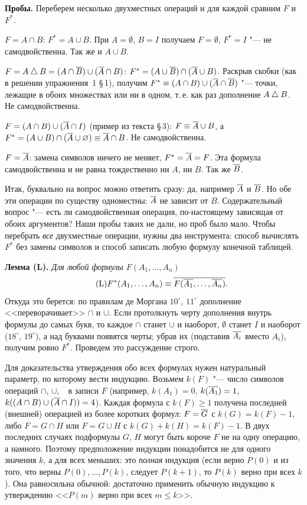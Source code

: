 \begin{solution}[1 (\S\,3)]
\textbf{Пробы.} Переберем несколько двухместных операций и для каждой
сравним $F$ и $F^*$.

$F=A\cap B$: $F^*=A\cup B$. При $A=\emptyset$, $B=I$ получаем $F=\emptyset$,
$F^*=I$ "--- не самодвойственна. Так же и $A\cup B$.

$F=A\mathbin{\triangle} B=(A\cap\overline{B})\cup(\overline{A}\cap B)$: $F^*=(A\cup\overline{B})\cap(\overline{A}\cup B)$.
Раскрыв скобки (как в решении упражнения~1 \S\,1), получим
$F^*\equiv(A\cap B)\cup(\overline{A}\cap\overline{B})$ "--- точки, лежащие в обоих
множествах или ни в одном, т.\,е. как раз дополнение $A\mathbin{\triangle} B$. Не
самодвойственна.

$F=(A\cap B)\cup(\overline{A}\cap I)$ (пример из текста \S\,3): $F\equiv\overline{A}\cup B$,
а $F^*=(A\cup B)\cap(\overline{A}\cup\varnothing)\equiv\overline{A}\cap B$. Не
самодвойственна.

$F=\overline{A}$: замена символов ничего не меняет, $F^*=\overline{A}=F$. Эта формула
самодвойственна и не равна тождественно ни $A$, ни $B$. Так же $\overline{B}$.

Итак, буквально на вопрос можно ответить сразу: да, например $\overline{A}$
и $\overline{B}$. Но обе эти операции по существу одноместны: $\overline{A}$ не зависит
от $B$. Содержательный вопрос "--- есть ли самодвойственная операция,
по-настоящему зависящая от обоих аргументов? Наши пробы таких не дали,
но проб было мало. Чтобы перебрать \emph{все} двухместные операции, нужны
два инструмента: способ вычислять $F^*$ без замены символов и способ
записать любую формулу конечной таблицей.

\textbf{Лемма (L).} \emph{Для любой формулы $F(A_1,\dots,A_n)$}
\begin{equation*}\tag{L}
F^*(A_1,\dots,A_n)\equiv\overline{F(\overline{A_1},\dots,\overline{A_n})}.
\end{equation*}
Откуда это берется: по правилам де Моргана $10^\circ$, $11^\circ$
дополнение <<переворачивает>> $\cap$ и $\cup$. Если протолкнуть черту
дополнения внутрь формулы до самых букв, то каждое $\cap$ станет $\cup$
и наоборот, $\emptyset$ станет $I$ и наоборот ($18^\circ$, $19^\circ$),
а над буквами появятся черты; убрав их (подставив $\overline{A_i}$ вместо $A_i$),
получим ровно $F^*$. Проведем это рассуждение строго.

Для доказательства утверждения обо всех формулах нужен натуральный
параметр, по которому вести индукцию. Возьмем $k(F)$ "--- число символов
операций $\cap$, $\cup$, ${}^{\overline{\phantom a}}$ в записи $F$
(например, $k(A_1)=0$, $k(\overline{A_1})=1$, $k((A\cap B)\cup(\overline{A}\cap I))=4$).
Каждая формула с $k(F)\ge1$ получена последней (внешней) операцией из
более коротких формул: $F=\overline{G}$ с $k(G)=k(F)-1$, либо $F=G\cap H$ или
$F=G\cup H$ с $k(G)+k(H)=k(F)-1$. В двух последних случаях подформулы
$G$, $H$ могут быть короче $F$ не на одну операцию, а намного. Поэтому
предположение индукции понадобится не для одного значения $k$, а для всех
меньших: это \emph{полная} индукция (если верно $P(0)$ и из того, что
верны $P(0),\dots,P(k)$, следует $P(k+1)$, то $P(k)$ верно при всех $k$).
Она равносильна обычной: достаточно применить обычную индукцию
к утверждению <<$P(m)$ верно при всех $m\le k$>>.


\end{solution}
